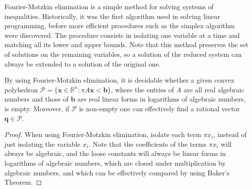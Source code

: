 Fourier-Motzkin elimination is a simple method for solving systems of
inequalities. Historically, it was the first algorithm used in solving
linear programming, before more efficient procedures such as the
simplex algorithm were discovered. The procedure consists in isolating one
variable at a time and matching all its lower and upper bounds. Note
that this method preserves the set of solutions on the remaining
variables, so a solution of the reduced system can always be extended
to a solution of the original one.

\begin{theorem}
\label{thm:fme}
  By using Fourier-Motzkin elimination, it is decidable whether a
  given convex polyhedron
  $\mathcal{P} = \lbrace \boldsymbol{x} \in \mathbb{R}^{n} : \pi
  A\boldsymbol{x} < \boldsymbol{b} \rbrace$,
  where the entries of $A$ are all real algebraic numbers and
  those of $\boldsymbol{b}$ are real linear forms in logarithms of
  algebraic numbers, is empty.  Moreover, if $\mathcal{P}$ is
  non-empty one can effectively find a rational vector
  $\boldsymbol{q} \in \mathcal{P}$.
\end{theorem}

\begin{proof}
When using Fourier-Motzkin elimination, isolate each term $\pi x_{i}$, instead of just isolating the variable $x_{i}$. Note that the coefficients of the terms $\pi x_{i}$ will always be algebraic, and the loose constants will always be linear forms in logarithms of algebraic numbers, which are closed under multiplication by algebraic numbers, and which can be effectively compared by using Baker's Theorem.
\end{proof}
